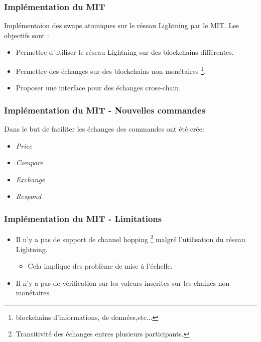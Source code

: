 \begin{frame}
	\frametitle{Implémentation du MIT}
	Implémentaion des swaps atomiques sur le réseau Lightning par le MIT. Les objectifs sont :
	\newline
	\begin{itemize}
		\item Permettre d'utiliser le réseau Lightning sur des blockchains différentes.
		\item Permettre des échanges sur des blockchains non monétaires \footnote{blockchains d'informations, de données,etc...}.
		\item Proposer une interface pour des échanges cross-chain.
	\end{itemize}

\end{frame}


\begin{frame}
	\frametitle{Implémentation du MIT - Nouvelles commandes}
	Dans le but de faciliter les échanges des commandes ont été crée:
	\newline
	\begin{itemize}
		\item \textit{Price}
		\item \textit{Compare}
		\item \textit{Exchange}
		\item \textit{Respond}
	\end{itemize}
\end{frame}


\begin{frame}
	\frametitle{Implémentation du MIT - Limitations}


	\begin{itemize}
		\item Il n'y a pas de support de channel hopping \footnote{Transitivité des échanges entres plusieurs participants.} malgré l'utilisation du réseau Lightning.
		      \begin{itemize}
			      \item Cela implique des problème de mise à l'échelle.
		      \end{itemize}
		\item Il n'y a pas de vérification sur les valeurs inscrites sur les chaines non monétaires.
	\end{itemize}
\end{frame}
